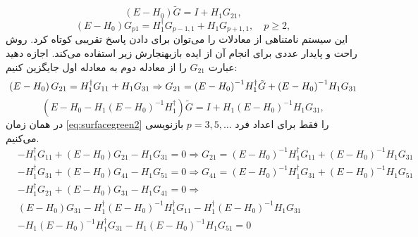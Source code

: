 \begin{equation}
    \left( E-{{H}_{0}} \right)\tilde{G}=I+{{H}_{1}}{{G}_{21}},
    \label{eq:surfacegreen1}
\end{equation}
\begin{equation}
    \left( E-{{H}_{0}} \right){{G}_{p1}}=H_{1}^{\dagger }{{G}_{p-1,1}}+{{H}_{1}}{{G}_{p+1,1}},\quad p\ge 2,
    \label{eq:surfacegreen2}
\end{equation}
این سیستم نامتناهی از معادلات را می‌توان برای دادن پاسخ تقریبی کوتاه کرد. روش راحت و پایدار عددی برای انجام آن از ایده بازبهنجارش زیر استفاده می‌کند. اجازه دهید عبارت $G_{21}$ را از معادله دوم به معادله اول جایگزین کنیم:
\begin{equation}
    \left( E-{{H}_{0}} \right){{G}_{21}}=H_{1}^{\dagger }{{G}_{11}}+{{H}_{1}}{{G}_{31}}\Rightarrow {{G}_{21}}={{\left( E-{{H}_{0}} \right)}^{-1}}H_{1}^{\dagger }\tilde{G}+{{\left( E-{{H}_{0}} \right)}^{-1}}{{H}_{1}}{{G}_{31}}\\
\end{equation}
\begin{equation}
    \left( E-{{H}_{0}}-{{H}_{1}}{{\left( E-{{H}_{0}} \right)}^{-1}}H_{1}^{\dagger } \right)\tilde{G}=I+{{H}_{1}}{{\left( E-{{H}_{0}} \right)}^{-1}}{{H}_{1}}{{G}_{31}},
\end{equation}
در همان زمان \ref{eq:surfacegreen2} را فقط برای اعداد فرد $p = 3,5,\dots$ بازنویسی می‌کنیم.
\begin{equation}
    \begin{aligned}
          & -H_{1}^{\dagger }{{G}_{11}}+\left( E-{{H}_{0}} \right){{G}_{21}}-{{H}_{1}}{{G}_{31}}=0\Rightarrow {{G}_{21}}={{\left( E-{{H}_{0}} \right)}^{-1}}H_{1}^{\dagger }{{G}_{11}}+{{\left( E-{{H}_{0}} \right)}^{-1}}{{H}_{1}}{{G}_{31}} \\ 
         & -H_{1}^{\dagger }{{G}_{31}}+\left( E-{{H}_{0}} \right){{G}_{41}}-{{H}_{1}}{{G}_{51}}=0\Rightarrow {{G}_{41}}={{\left( E-{{H}_{0}} \right)}^{-1}}H_{1}^{\dagger }{{G}_{31}}+{{\left( E-{{H}_{0}} \right)}^{-1}}{{H}_{1}}{{G}_{51}} \\ 
         & -H_{1}^{\dagger }{{G}_{21}}+\left( E-{{H}_{0}} \right){{G}_{31}}-{{H}_{1}}{{G}_{41}}=0\Rightarrow  \\ 
         & \left( E-{{H}_{0}} \right){{G}_{31}}-H_{1}^{\dagger }{{\left( E-{{H}_{0}} \right)}^{-1}}H_{1}^{\dagger }{{G}_{11}}-H_{1}^{\dagger }{{\left( E-{{H}_{0}} \right)}^{-1}}{{H}_{1}}{{G}_{31}} \\ 
         & -{{H}_{1}}{{\left( E-{{H}_{0}} \right)}^{-1}}H_{1}^{\dagger }{{G}_{31}}-{{H}_{1}}{{\left( E-{{H}_{0}} \right)}^{-1}}{{H}_{1}}{{G}_{51}}=0 \\ 
    \end{aligned}
\end{equation}
